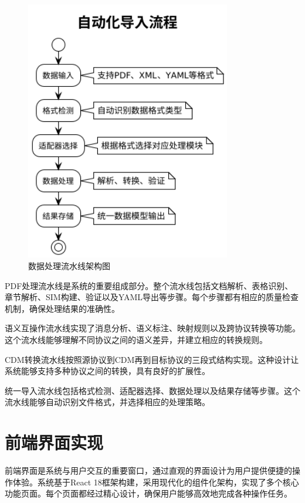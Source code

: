 \begin{figure}[H]
    \centering
    \includegraphics[width=0.8\textwidth,height=0.5\textheight,keepaspectratio]{chapters/fig-0/data_processing_pipeline.png}
    \caption{数据处理流水线架构图}
    \label{fig_data_processing_pipeline}
\end{figure}

PDF处理流水线是系统的重要组成部分。整个流水线包括文档解析、表格识别、章节解析、SIM构建、验证以及YAML导出等步骤。每个步骤都有相应的质量检查机制，确保处理结果的准确性。

语义互操作流水线实现了消息分析、语义标注、映射规则以及跨协议转换等功能。这个流水线能够理解不同协议之间的语义差异，并建立相应的转换规则。

CDM转换流水线按照源协议到CDM再到目标协议的三段式结构实现。这种设计让系统能够支持多种协议之间的转换，具有良好的扩展性。

统一导入流水线包括格式检测、适配器选择、数据处理以及结果存储等步骤。这个流水线能够自动识别文件格式，并选择相应的处理策略。


\section{前端界面实现}

前端界面是系统与用户交互的重要窗口，通过直观的界面设计为用户提供便捷的操作体验。系统基于React 18框架构建，采用现代化的组件化架构，实现了多个核心功能页面。每个页面都经过精心设计，确保用户能够高效地完成各种操作任务。

